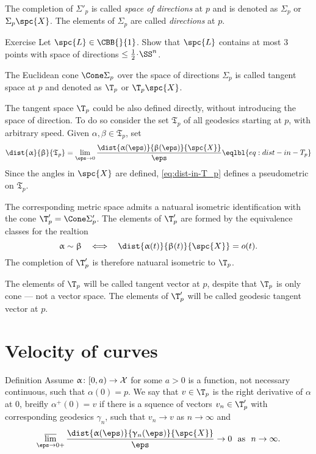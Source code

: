 The completion of $\Sigma'_p$ is called \emph{space of directions} at $p$ and is denoted as $\Sigma_p$ or $\Sigma_p\spc{X}$.
The elements of $\Sigma_p$ are called \emph{directions} at $p$.

\begin{thm}{Exercise} 
Let $\spc{L}\in\CBB{}{1}$.
Show that $\spc{L}$ contains at most 3 points with space of directions $\le\tfrac12\cdot\SS^n$.
\end{thm}

The Euclidean cone $\Cone\Sigma_p$ over the space of directions $\Sigma_p$ is called tangent space at  $p$ and denoted as $\T_p$ or $\T_p\spc{X}$.

The tangent space $\T_p$ could be also defined directly, without introducing the space of direction.
To do so consider the set $\mathfrak{T}_p$ of all geodesics starting at $p$, with arbitrary speed.
Given $\alpha,\beta\in \mathfrak{T}_p$,
set 
\[\dist{\alpha}{\beta}{\mathfrak{T}_p}
=
\lim_{\eps\to0} 
\frac{\dist{\alpha(\eps)}{\beta(\eps)}{\spc{X}}}\eps
\eqlbl{eq:dist-in-T_p}\]
Since the angles in $\spc{X}$ are defined, 
\ref{eq:dist-in-T_p}
defines a pseudometric on $\mathfrak{T}_p$.


The corresponding metric space admits a natuaral isometric identification with the cone $\T'_p=\Cone\Sigma'_p$.
The elements of $\T'_p$ are formed by the equivalence classes for the realtion 
\[\alpha\sim\beta\ \ \iff\ \ \dist{\alpha(t)}{\beta(t)}{\spc{X}}=o(t).\]
The completion of $\T'_p$ is therefore  natuaral isometric to $\T_p$.

The elements of $\T_p$ will be called tangent vector at $p$,
despite that $\T_p$ is only cone --- not a vector space.
The elements of $\T'_p$ will be called geodesic tangent vector at $p$.

\section{Velocity of curves}

\begin{thm}{Definition}\label{def:right-derivative}
Assume $\alpha\:[0,a)\to \spc{X}$ for some $a>0$ is a function, not necessary continuous, such that $\alpha(0)=p$.
We say that $v\in\T_p$ is the right derivative of $\alpha$ at $0$,
breifly $\alpha^+(0)=v$ if there is a squence of vectors $v_n\in\T'_p$
with corresponding geodesics $\gamma_n$, 
such that $v_n\to v$ as $n\to\infty$ and 
\[\limsup_{\eps\to0+}\frac{\dist{\alpha(\eps)}{\gamma_n(\eps)}{\spc{X}}}{\eps}\to 0\ \ \text{as}\ \ n\to\infty.\]
\end{thm}

